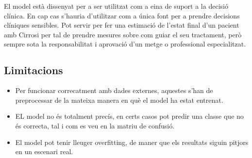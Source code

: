 El model està dissenyat per a ser utilitzat com a eina de suport a la decisió clínica. En cap cas s'hauria d'utilitzar com a única font per a prendre decisions clíniques sensibles. Pot servir per fer una estimació de l'estat final d'un pacient amb Cirrosi per tal de prendre mesures sobre com guiar el seu tractament, però sempre sota la responsabilitat i aprovació d'un metge o professional especialitzat.

\subsection{Limitacions}
\begin{itemize}
\item Per funcionar correcatment amb dades externes, aquestes s'han de preprocessar de la mateixa manera en què el model ha estat entrenat.
\item EL model no és totalment precís, en certs casos pot predir una classe que no és correcta, tal i com es veu en la matriu de confusió.
\item El model pot tenir lleuger overfitting, de maner que els resultats siguin pitjors en un escenari real.
\end{itemize}

